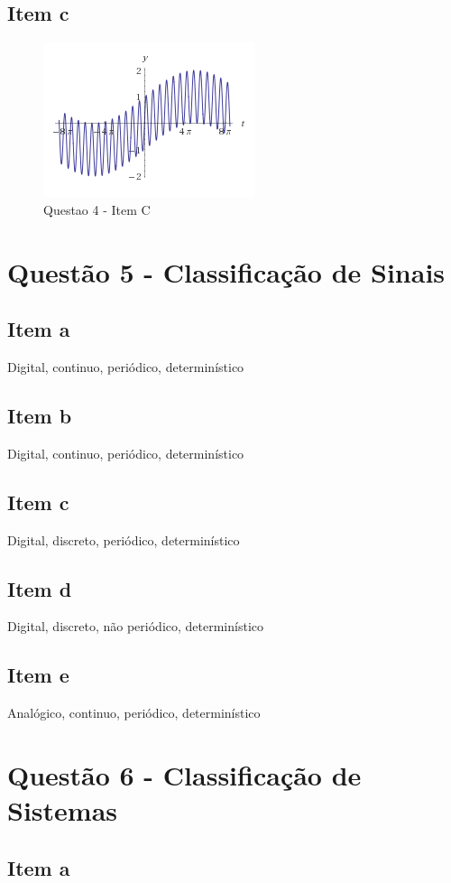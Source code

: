 \documentclass[a4paper, 12pt]{article}
\begin{document}
        \subsection{Item c}
            \begin{figure}[!ht]
            	\centering
            	\includegraphics{img/Figura8.PNG}
            	\caption{Questao 4 - Item C}
            \end{figure}          
    \section{Quest\~{a}o 5 - Classificação de Sinais}
        \subsection{Item a}
        Digital, continuo, periódico, determinístico 
        \subsection{Item b}
        Digital, continuo, periódico, determinístico 
        \subsection{Item c} 
        Digital, discreto, periódico, determinístico   
        \subsection{Item d} 
        Digital, discreto, não periódico, determinístico
        \subsection{Item e} 
        Analógico, continuo, periódico, determinístico
    \section{Quest\~{a}o 6 - Classificação de Sistemas}
        \subsection{Item a}
\end{document}
